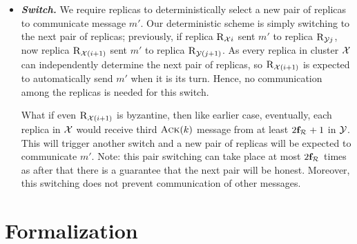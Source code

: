 \begin{itemize}[wide]
\item {\bf \em Switch.}
We require replicas to deterministically select a new pair of replicas to communicate message $m'$. 
Our deterministic scheme is simply switching to the next pair of replicas; 
previously, if replica $\textsc{R}_{{\mathcal{X}}{i}}$ sent $m'$ to replica $\textsc{R}_{{\mathcal{Y}}{j}}$, now 
replica $\textsc{R}_{{\mathcal{X}}{(i+1)}}$ sent $m'$ to replica $\textsc{R}_{{\mathcal{Y}}{(j+1)}}$.
As every replica in cluster $\mathcal{X}$ can independently determine the next pair of replicas, 
so $\textsc{R}_{{\mathcal{X}}{(i+1)}}$ is expected to automatically send $m'$ when it is its turn. 
Hence, no communication among the replicas is needed for this switch.

What if even $\textsc{R}_{{\mathcal{X}}{(i+1)}}$ is byzantine, then like earlier case, eventually, 
each replica in $\mathcal{X}$ would receive third $\textsc{Ack}(k)$ message from at least $2\textbf{f}_{\mathcal{R}_{\mathcal{}}}+1$ in $\mathcal{Y}$. 
This will trigger another switch and a new pair of replicas will be expected to communicate $m'$.
Note: this pair switching can take place at most $2\textbf{f}_{\mathcal{R}_{\mathcal{}}}$ times as after that there is 
a guarantee that the next pair will be honest.
Moreover, this switching does not prevent communication of other messages.



\end{itemize}


\section{Formalization}
